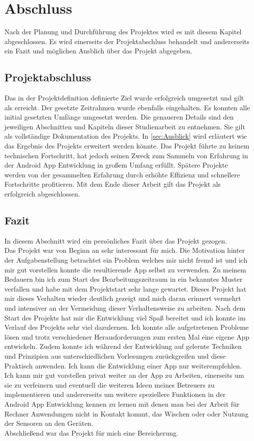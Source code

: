 \chapter{Abschluss}\label{chpt:schluss}
Nach der Planung und Durchführung des Projektes wird es mit diesem Kapitel abgeschlossen. Es wird einerseits der Projektabschluss behandelt und andererseits ein Fazit und möglichen Ausblich über das Projekt abgegeben.

\section{Projektabschluss}\label{sec:projektschluss}
Das in der Projektdefinition definierte Ziel wurde erfolgreich umgesetzt und gilt als erreicht. Der gesetzte Zeitrahmen wurde ebenfalls eingehalten. Es konnten alle initial gesetzten Umfänge umgesetzt werden. Die genaueren Details sind den jeweiligen Abschnitten und Kapiteln dieser Studienarbeit zu entnehmen. Sie gilt als vollständige Dokumentation des Projekts.
In \autoref{sec:Ausblick} wird erläutert wie das Ergebnis des Projekts erweitert werden könnte. Das Projekt führte zu keinem technischen Fortschritt, hat jedoch seinen Zweck zum Sammeln von Erfahrung in der Android App Entwicklung in großem Umfang erfüllt. Spätere Projekte werden von der gesammelten Erfahrung durch erhöhte Effizienz und schnellere Fortschritte profitieren. Mit dem Ende dieser Arbeit gilt das Projekt als erfolgreich abgeschlossen.

\section{Fazit}\label{sec:fazit}
In diesem Abschnitt wird ein persönliches Fazit über das Projekt gezogen.\\
Das Projekt war von Beginn an sehr interessant für mich. Die Motivation hinter der Aufgabenstellung betrachtet ein Problem welches mir nicht fremd ist und ich mir gut vorstellen konnte die resultierende App selbst zu verwenden. Zu meinem Bedauern bin ich zum Start des Bearbeitungszeitraum in ein bekanntes Muster verfallen und habe mit dem Projektstart sehr lange gewartet. Dieses Projekt hat mir dieses Verhalten wieder deutlich gezeigt und mich daran erinnert vermehrt und intensiver an der Vermeidung dieser Verhaltensweise zu arbeiten. Nach dem Start des Projekts hat mir die Entwicklung viel Spaß bereitet und ich konnte im Verlauf des Projekts sehr viel dazulernen. Ich konnte alle aufgetretenen Probleme lösen und trotz verschiedener Herausforderungen zum ersten Mal eine eigene App entwickeln. Zudem konnte ich während der Entwicklung auf gelernte Techniken und Prinzipien aus unterschiedlichen Vorlesungen zurückgreifen und diese Praktisch anwenden. Ich kann die Entwicklung einer App nur weiterempfehlen. Ich kann mir gut vorstellen privat weiter an der App zu Arbeiten, einerseits um sie zu verfeinern und eventuell die weiteren Ideen meines Betreuers zu implementieren und andererseits um weitere speziellere Funktionen in der Android App Entwicklung kennen zu lernen mit denen man bei der Arbeit für Rechner Anwendungen nicht in Kontakt kommt, \zB das Wischen oder oder Nutzung der Sensoren an den Geräten.\\
Abschließend war das Projekt für mich eine Bereicherung.

